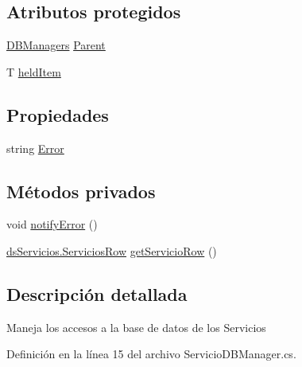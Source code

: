 \subsection*{Atributos protegidos}
\begin{DoxyCompactItemize}
\item 
\hyperlink{class_proyecto___integrador__3_1_1_d_b_managers}{D\-B\-Managers} \hyperlink{class_proyecto___integrador__3_1_1_d_b_managers_1_1_d_b_manager_3_01_t_01_4_a06315e75298c8f2fd46f32dc7c9a80b2}{Parent}
\item 
T \hyperlink{class_proyecto___integrador__3_1_1_d_b_managers_1_1_d_b_manager_3_01_t_01_4_a3b67ae3b5b3b9c3793d56c1407d7dcff}{held\-Item}
\end{DoxyCompactItemize}
\subsection*{Propiedades}
\begin{DoxyCompactItemize}
\item 
string \hyperlink{class_proyecto___integrador__3_1_1_d_b_managers_1_1_d_b_manager_3_01_t_01_4_a6e5caaed2ee1a4d067dfbf5aaa1b1fa8}{Error}
\end{DoxyCompactItemize}
\subsection*{Métodos privados}
\begin{DoxyCompactItemize}
\item 
void \hyperlink{class_proyecto___integrador__3_1_1_d_b_managers_1_1_servicio_d_b_manager_aec27444dd8d35014f241b2b6ab0f83b9}{notify\-Error} ()
\item 
\hyperlink{class_proyecto___integrador__3_1_1ds_servicios_1_1_servicios_row}{ds\-Servicios.\-Servicios\-Row} \hyperlink{class_proyecto___integrador__3_1_1_d_b_managers_1_1_servicio_d_b_manager_ae48a4f63dee1bf94e8a93d7a47586233}{get\-Servicio\-Row} ()
\end{DoxyCompactItemize}


\subsection{Descripción detallada}
Maneja los accesos a la base de datos de los Servicios 



Definición en la línea 15 del archivo Servicio\-D\-B\-Manager.\-cs.



